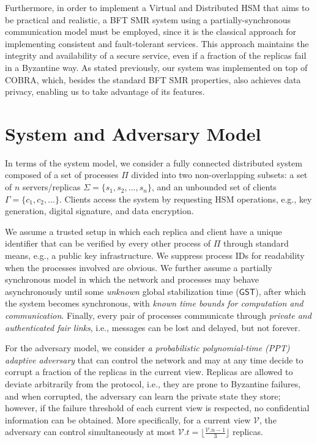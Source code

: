 Furthermore, in order to implement a Virtual and Distributed HSM that aims to be practical and realistic, a BFT SMR system using a partially-synchronous communication model must be employed, since it is the classical approach for implementing consistent and fault-tolerant services. This approach maintains the integrity and availability of a secure service, even if a fraction of the replicas fail in a Byzantine way. As stated previously, our system was implemented on top of COBRA, which, besides the standard BFT SMR properties, also achieves data privacy, enabling us to take advantage of its features.


\section{System and Adversary Model} \label{sec:system-adv-model}

In terms of the system model, we consider a fully connected distributed system composed of a set of processes $\Pi$ divided into two non-overlapping subsets: a set of $n$ servers/replicas $\Sigma = \{s_1,s_2,..., s_n\}$, and an unbounded set of clients $\Gamma = \{c_1,c_2,...\}$. 
Clients access the system by requesting HSM operations, e.g., key generation, digital signature, and data encryption.

We assume a trusted setup in which each replica and client have a unique identifier that can be verified by every other process of $\Pi$ through standard means, e.g., a public key infrastructure. We suppress process IDs for readability when the processes involved are obvious. We further assume a partially synchronous model in which the network and processes may behave asynchronously until some \emph{unknown} global stabilization time ($\mathsf{GST}$), after which the system becomes synchronous, with \emph{known time bounds for computation and communication}. Finally, every pair of processes communicate through \emph{private and authenticated fair links}, i.e., messages can be lost and delayed, but not forever.

For the adversary model, we consider \textit{a probabilistic polynomial-time (PPT) adaptive adversary} that can control the network and may at any time decide to corrupt a fraction of the replicas in the current view. Replicas are allowed to deviate arbitrarily from the protocol, i.e., they are prone to Byzantine failures, and when corrupted, the adversary can learn the private state they store; however, if the failure threshold of each current view is respected, no confidential information can be obtained. More specifically, for a current view $\mathcal{V}$, the adversary can control simultaneously at most $\mathcal{V}.t = \lfloor\frac{\mathcal{V}.n - 1}{3} \rfloor$ replicas.

